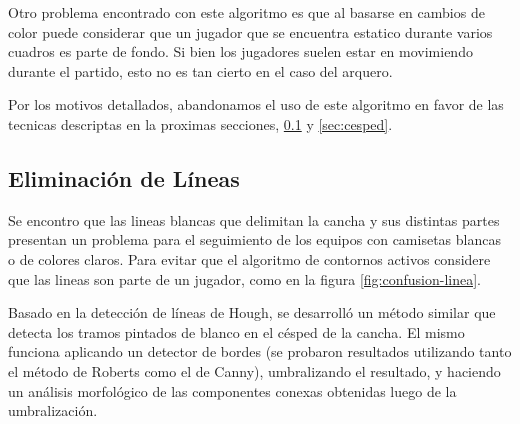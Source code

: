 Otro problema encontrado con este algoritmo es que al basarse en cambios de color
puede considerar que un jugador que se encuentra estatico durante varios cuadros
es parte de fondo. Si bien los jugadores suelen estar en movimiendo durante el 
partido, esto no es tan cierto en el caso del arquero.

Por los motivos detallados, abandonamos el uso de este algoritmo en favor de las
tecnicas descriptas en la proximas secciones, \ref{sec:lineas} y \ref{sec:cesped}.

\subsection{Eliminación de Líneas}
\label{sec:lineas}

Se encontro que las lineas blancas que delimitan la cancha y sus distintas partes
presentan un problema para el seguimiento de los equipos con camisetas blancas o de
colores claros. Para evitar que el algoritmo de contornos activos considere que las
lineas son parte de un jugador, como en la figura \ref{fig:confusion-linea}.

Basado en la detección de líneas de Hough, se desarrolló un método similar que
detecta los tramos pintados de blanco en el césped de la cancha. El mismo
funciona aplicando un detector de bordes (se probaron resultados utilizando
tanto el método de Roberts como el de Canny), umbralizando el resultado, y
haciendo un análisis morfológico de las componentes conexas obtenidas luego de
la umbralización.

